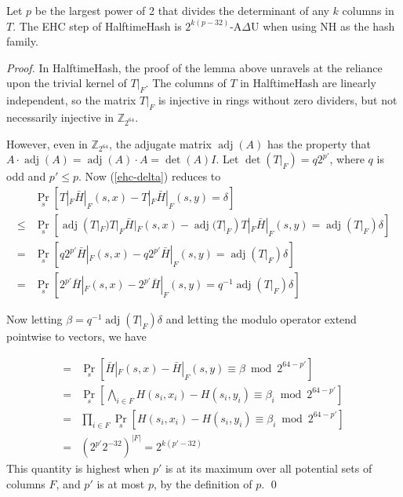 \documentclass[runningheads]{llncs}
\DeclareMathOperator{\adj}{adj}
\newcommand{\ints}{\mathbb{Z}}
\begin{document}
\begin{theorem}
  Let $p$ be the largest power of 2 that divides the determinant of any $k$ columns in $T$.
  The EHC step of HalftimeHash is $2^{k(p-32)}$-A$\Delta$U when using NH as the hash family.
\end{theorem}

\begin{proof}
  In HalftimeHash, the proof of the lemma above unravels at the reliance upon the trivial kernel of $T|_F$.
  The columns of $T$ in HalftimeHash are linearly independent, so the matrix $T|_F$ is injective in rings without zero dividers, but not necessarily injective in $\ints_{2^{64}}$.

  However, even in $\ints_{2^{64}}$, the adjugate matrix $\adj(A)$ has the property that $A \cdot \adj(A) = \adj(A) \cdot A = \det(A) I$.
  Let $\det(T|_F) = q2^{p'}$, where $q$ is odd and $p' \le p$.
  Now (\ref{ehc-delta}) reduces to
  \[
  \begin{array}{rl}
    &   \Pr_s[T|_F \bar{H}|_F(s,x) - T|_F \bar{H}|_F(s,y) = \delta]\\
    \leq &  \Pr_s[\adj(T|_F) T|_F \bar{H}|_F(s,x) - \adj(T|_F) T|_F \bar{H}|_F(s,y) = \adj(T|_F) \delta] \\
    = &  \Pr_s[q2^{p'}\bar{H}|_F(s,x) - q2^{p'}\bar{H}|_F(s,y) = \adj(T|_F) \delta] \\
    = &  \Pr_s[2^{p'}\bar{H}|_F(s,x) - 2^{p'}\bar{H}|_F(s,y) = q^{-1} \adj(T|_F) \delta]
  \end{array}
  \]

  Now letting $\beta = q^{-1} \adj(T|_F) \delta$ and letting the modulo operator extend pointwise to vectors, we have

  \[
  \begin{array}{rl}
    = &  \Pr_s[\bar{H}|_F(s,x) - \bar{H}|_F(s,y) \equiv \beta \bmod 2^{64-p'}] \\
    = &  \Pr_s\left[\bigwedge_{i \in F} H(s_i,x_i) - H(s_i,y_i) \equiv \beta_i \bmod 2^{64-p'}\right] \\
    = &  \prod_{i \in F} \Pr_s\left[ H(s_i,x_i) - H(s_i,y_i) \equiv \beta_i \bmod 2^{64-p'}\right] \\
    = & \left(2^{p'} 2^{-32}\right)^{|F|} = 2^{k(p'-32)}
  \end{array}
  \]
  This quantity is highest when $p'$ is at its maximum over all potential sets of columns $F$, and $p'$ is at most $p$, by the definition of $p$.
  \qed
\end{proof}
\end{document}

